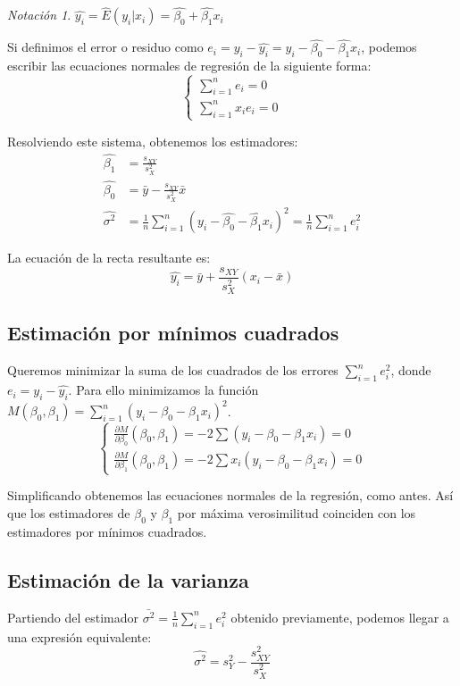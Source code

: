 \documentclass{report}
\theoremstyle{remark}
\theoremstyle{remark}
\theoremstyle{remark}
\newtheorem*{notation}{Notación}
\theoremstyle{definition}
\theoremstyle{definition}
\theoremstyle{definition}
\begin{document}
\begin{notation}
    $\hat{y_i} = \hat{E}(y_i | x_i) = \hat{\beta_0} + \hat{\beta_1}x_i$
\end{notation}

Si definimos el error o residuo como $e_i = y_i - \hat{y_i} = y_i - \hat{\beta_0} - \hat{\beta_1}x_i$, podemos escribir las ecuaciones normales de regresión de la siguiente forma:
$$\begin{cases}
        \sum_{i=1}^n e_i = 0 \\
        \sum_{i=1}^n x_ie_i = 0
    \end{cases}$$

Resolviendo este sistema, obtenemos los estimadores:
\begin{align*}
    \hat{\beta_1}  & = \frac{s_{XY}}{s_X^2}                                                                                 \\
    \hat{\beta_0}  & = \bar{y} - \frac{s_{XY}}{s_X^2}\bar{x}                                                                \\
    \hat{\sigma^2} & = \frac{1}{n} \sum_{i=1}^n (y_i - \hat{\beta_0} - \hat{\beta_1}x_i)^2 = \frac{1}{n} \sum_{i=1}^n e_i^2
\end{align*}

La ecuación de la recta resultante es:
$$\hat{y_i} = \bar{y} + \frac{s_{XY}}{s_X^2}(x_i - \bar{x})$$

\subsection*{Estimación por mínimos cuadrados}
Queremos minimizar la suma de los cuadrados de los errores $\sum_{i=1}^n e_i^2$, donde $e_i = y_i - \hat{y_i}$.
Para ello minimizamos la función $M(\beta_0, \beta_1) = \sum_{i=1}^n (y_i - \beta_0 - \beta_1x_i)^2$.
$$\begin{cases}
        \frac{\partial M}{\partial \beta_0}(\beta_0, \beta_1) = -2\sum(y_i - \beta_0 - \beta_1x_i) = 0 \\
        \frac{\partial M}{\partial \beta_1}(\beta_0, \beta_1) = -2\sum x_i(y_i - \beta_0 - \beta_1x_i) = 0
    \end{cases}$$

Simplificando obtenemos las ecuaciones normales de la regresión, como antes.
Así que los estimadores de $\beta_0$ y $\beta_1$ por máxima verosimilitud coinciden con los estimadores por mínimos cuadrados.

\subsection*{Estimación de la varianza}
Partiendo del estimador $\bar{\sigma^2} = \frac{1}{n} \sum_{i=1}^n e_i^2$ obtenido previamente, podemos llegar a una expresión equivalente:
$$\hat{\sigma^2} = s_Y^2 - \frac{s_{XY}^2}{s_X^2}$$
\end{document}
